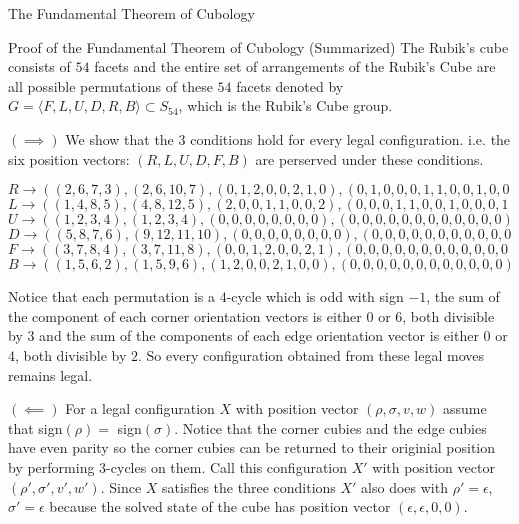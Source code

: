\documentclass[final]{beamer}
\newlength{\colwidth}
\begin{document}
\begin{frame}[t]
\begin{columns}[t]
\begin{column}{\colwidth}
\begin{alertblock}{The Fundamental Theorem of Cubology}

  \end{alertblock}

  \begin{block}{Proof of the Fundamental Theorem of Cubology (Summarized)}
    The Rubik's cube consists of $54$ facets and the entire set of arrangements of the Rubik's Cube are all possible permutations of these $54$ facets 
    denoted  by $G = \langle F,L,U,D,R,B\rangle \subset S_{54}$, which is the Rubik's Cube group.



$(\implies)$ 
We show that the $3$ conditions hold for every legal configuration. i.e. the six position vectors: $(R,L,U,D,F,B)$ are perserved under these conditions.

$$R \rightarrow ((2,6,7,3),(2,6,10,7),(0,1,2,0,0,2,1,0),(0,1,0,0,0,1,1,0,0,1,0,0))$$
$$L \rightarrow ((1 ,4,8,5),(4,8,12,5),(2, 0, 0, 1, 1, 0, 0, 2), (0, 0, 0, 1, 1, 0, 0, 1, 0, 0, 0, 1))$$
$$U \rightarrow ((1, 2, 3, 4), (1, 2, 3, 4), (0, 0, 0, 0, 0, 0, 0, 0), (0, 0, 0, 0, 0, 0, 0, 0, 0, 0, 0, 0))$$
$$D \rightarrow ((5, 8, 7, 6), (9, 12, 11, 10), (0, 0, 0, 0, 0, 0, 0, 0), (0, 0, 0, 0, 0, 0, 0, 0, 0, 0, 0, 0))$$
$$F \rightarrow ((3, 7, 8, 4), (3, 7, 11, 8), (0, 0, 1, 2, 0, 0, 2, 1), (0, 0, 0, 0, 0, 0, 0, 0, 0, 0, 0, 0))$$
$$B \rightarrow ((1, 5, 6, 2), (1, 5, 9, 6), (1, 2, 0, 0, 2, 1, 0, 0), (0, 0, 0, 0, 0, 0, 0, 0, 0, 0, 0, 0))$$

Notice that each permutation is a $4$-cycle which is odd with sign $-1$, the sum of the component of each corner orientation vectors is either $0$ or $6$, both divisible by $3$ and 
the sum of the components of each edge orientation vector is either $0$ or $4$, both divisible by $2$.
So every configuration obtained from these legal moves remains legal.

$(\impliedby)$ 
For a legal configuration $X$ with position vector $(\rho, \sigma, v, w)$ assume that sign$(\rho)=$ sign$(\sigma)$.
Notice that the corner cubies and the edge cubies have even parity so the corner cubies can be returned to their originial position by performing $3$-cycles on them. 
Call this configuration $X'$ with position vector $(\rho', \sigma', v', w')$.
Since $X$ satisfies the three conditions $X'$ also does with $\rho' = \epsilon$, $\sigma' = \epsilon$ because the solved state of the cube has position vector $(\epsilon, \epsilon, 0 , 0)$.


\end{block}
\end{column}
\end{columns}
\end{frame}
\end{document}
